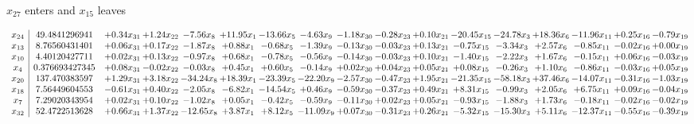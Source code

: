 \documentclass[9pt]{article}
\begin{document}
 $ x_{27} $ enters and $ x_{15} $ leaves 

 \[\begin{array}{c| c c@{\hskip 2pt} c@{\hskip 2pt} c@{\hskip 2pt} c@{\hskip 2pt} c@{\hskip 2pt} c@{\hskip 2pt} c@{\hskip 2pt} c@{\hskip 2pt} c@{\hskip 2pt} c@{\hskip 2pt} c@{\hskip 2pt} c@{\hskip 2pt} c@{\hskip 2pt} c@{\hskip 2pt} c@{\hskip 2pt} }
 x_{24}   &  49.4841296941 & +  0.34 x_{31} & +  1.24 x_{22} & -7.56 x_{8} & + 11.95 x_{1} & -13.66 x_{5} & -4.63 x_{9} & -1.18 x_{30} & -0.28 x_{23} & +  0.10 x_{21} & -20.45 x_{15} & -24.78 x_{3} & + 18.36 x_{6} & -11.96 x_{11} & +  0.25 x_{16} & -0.79 x_{19}\\
 x_{13}   &  8.76560431401 & +  0.06 x_{31} & +  0.17 x_{22} & -1.87 x_{8} & +  0.88 x_{1} & -0.68 x_{5} & -1.39 x_{9} & -0.13 x_{30} & -0.03 x_{23} & +  0.13 x_{21} & -0.75 x_{15} & -3.34 x_{3} & +  2.57 x_{6} & -0.85 x_{11} & -0.02 x_{16} & +  0.00 x_{19}\\
 x_{10}   &  4.40120427711 & +  0.02 x_{31} & +  0.13 x_{22} & -0.97 x_{8} & +  0.68 x_{1} & -0.78 x_{5} & -0.56 x_{9} & -0.14 x_{30} & -0.03 x_{23} & +  0.10 x_{21} & -1.40 x_{15} & -2.22 x_{3} & +  1.67 x_{6} & -0.15 x_{11} & +  0.06 x_{16} & -0.03 x_{19}\\
 x_{4}   &  0.376693427345 & +  0.08 x_{31} & -0.02 x_{22} & -0.03 x_{8} & +  0.45 x_{1} & +  0.60 x_{5} & -0.14 x_{9} & +  0.02 x_{30} & +  0.04 x_{23} & +  0.05 x_{21} & +  0.08 x_{15} & -0.26 x_{3} & +  1.10 x_{6} & -0.86 x_{11} & -0.03 x_{16} & +  0.05 x_{19}\\
 x_{20}   &  137.470383597 & +  1.29 x_{31} & +  3.18 x_{22} & -34.24 x_{8} & + 18.39 x_{1} & -23.39 x_{5} & -22.20 x_{9} & -2.57 x_{30} & -0.47 x_{23} & +  1.95 x_{21} & -21.35 x_{15} & -58.18 x_{3} & + 37.46 x_{6} & -14.07 x_{11} & -0.31 x_{16} & -1.03 x_{19}\\
 x_{18}   &  7.56449604553 & -0.61 x_{31} & +  0.40 x_{22} & -2.05 x_{8} & -6.82 x_{1} & -14.54 x_{5} & +  0.46 x_{9} & -0.59 x_{30} & -0.37 x_{23} & +  0.49 x_{21} & +  8.31 x_{15} & -0.99 x_{3} & +  2.05 x_{6} & +  6.75 x_{11} & +  0.09 x_{16} & -0.04 x_{19}\\
 x_{7}   &  7.29020343954 & +  0.02 x_{31} & +  0.10 x_{22} & -1.02 x_{8} & +  0.05 x_{1} & -0.42 x_{5} & -0.59 x_{9} & -0.11 x_{30} & +  0.02 x_{23} & +  0.05 x_{21} & -0.93 x_{15} & -1.88 x_{3} & +  1.73 x_{6} & -0.18 x_{11} & -0.02 x_{16} & -0.02 x_{19}\\
 x_{32}   &  52.4722513628 & +  0.66 x_{31} & +  1.37 x_{22} & -12.65 x_{8} & +  3.87 x_{1} & +  8.12 x_{5} & -11.09 x_{9} & +  0.07 x_{30} & -0.31 x_{23} & +  0.26 x_{21} & -5.32 x_{15} & -15.30 x_{3} & +  5.11 x_{6} & -12.37 x_{11} & -0.55 x_{16} & -0.39 x_{19}\\

\end{array}\]
\end{document}
